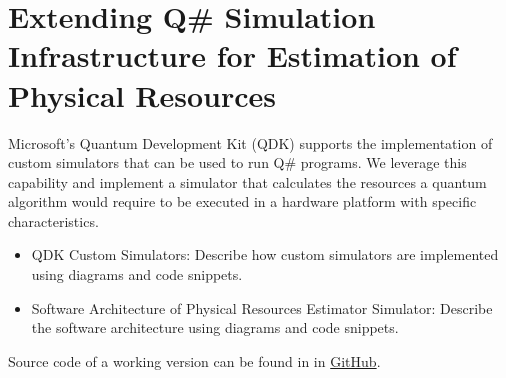 \section{Extending Q\# Simulation Infrastructure for Estimation of Physical Resources}

Microsoft's Quantum Development Kit (QDK) supports the implementation of custom simulators that can be used to run Q\# programs. We leverage this capability and implement a simulator that calculates the resources a quantum algorithm would require to be executed in a hardware platform with specific characteristics.

\begin{itemize}
    \item QDK Custom Simulators: Describe how custom simulators are implemented using diagrams and code snippets.
    \item Software Architecture of Physical Resources Estimator Simulator: Describe the software architecture using diagrams and code snippets.
\end{itemize}

Source code of a working version can be found in in \href{https://github.com/cesarzc/uw-master-in-physics-project}{GitHub}.
